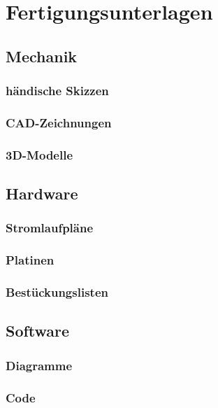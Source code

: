 \documentclass[titlepage,12pt,twoside]{article}
\begin{document}
\section{Fertigungsunterlagen}
\subsection{Mechanik}
\subsubsection{händische Skizzen}
\subsubsection{CAD-Zeichnungen}
\subsubsection{3D-Modelle}

\subsection{Hardware}
\subsubsection{Stromlaufpläne}
\subsubsection{Platinen}
\subsubsection{Bestückungslisten}

\subsection{Software}
\subsubsection{Diagramme}
\subsubsection{Code}

\end{document}
